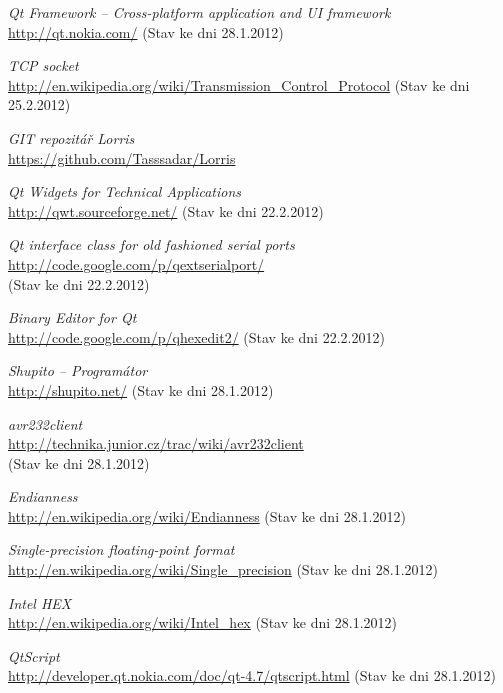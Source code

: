 \documentclass[12pt, a4paper, oneside]{article}
\newcommand{\It}{\textit}  %
\begin{document}
 \begin{thebibliography}{99}
     \It{Qt Framework -- Cross-platform application and UI framework} \\
    \url{http://qt.nokia.com/} (Stav ke dni 28.1.2012)

     \It{TCP socket} \\
    \url{http://en.wikipedia.org/wiki/Transmission_Control_Protocol} (Stav ke dni 25.2.2012)

     \It{GIT repozitář Lorris} \\
    \url{https://github.com/Tasssadar/Lorris}

     \It{Qt Widgets for Technical Applications} \\
    \url{http://qwt.sourceforge.net/} (Stav ke dni 22.2.2012)

     \It{Qt interface class for old fashioned serial ports} \\
    \url{http://code.google.com/p/qextserialport/} \\
    (Stav ke dni 22.2.2012)

     \It{Binary Editor for Qt} \\
    \url{http://code.google.com/p/qhexedit2/} (Stav ke dni 22.2.2012)
    
     \It{Shupito -- Programátor} \\
    \url{http://shupito.net/} (Stav ke dni 28.1.2012)

     \It{avr232client} \\
    \url{http://technika.junior.cz/trac/wiki/avr232client}\\
    (Stav ke dni 28.1.2012)

     \It{Endianness} \\
    \url{http://en.wikipedia.org/wiki/Endianness} (Stav ke dni 28.1.2012)

     \It{Single-precision floating-point format} \\
    \url{http://en.wikipedia.org/wiki/Single_precision} (Stav ke dni 28.1.2012)

     \It{Intel HEX} \\
    \url{http://en.wikipedia.org/wiki/Intel_hex} (Stav ke dni 28.1.2012)
    
     \It{QtScript} \\
    \url{http://developer.qt.nokia.com/doc/qt-4.7/qtscript.html} (Stav ke dni 28.1.2012)    
\end{thebibliography}
\end{document}
